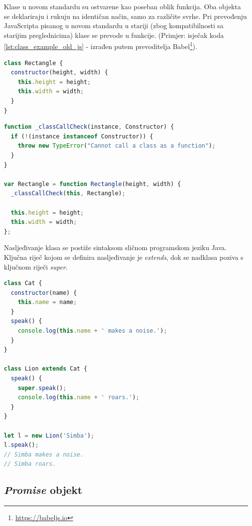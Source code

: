 \documentclass[times, utf8, zavrsni, numeric]{fer}
\newcommand{\razmakp}{\vspace{18pt}}
\newcommand{\razmaks}{\vspace{10pt}}
\begin{document}
Klase u novom standardu su ostvarene kao poseban oblik funkcija.\citep{MDNClass}
Oba objekta se deklariraju i rukuju na identičan način, samo za različite svrhe.
Pri prevođenju JavaScripta pisanog u novom standardu u stariji (zbog kompatibilnosti sa starijim preglednicima) klase se prevode u funkcije.
(Primjer: isječak koda \ref{lst:class_example_old_js} - izrađen putem prevoditelja Babel\footnote{\url{https://babeljs.io}}).

\razmakp
\begin{lstlisting}[language=JavaScript, caption={Primjer klase}, label={lst:class_example}]
class Rectangle {
  constructor(height, width) {
    this.height = height;
    this.width = width;
  }
}
\end{lstlisting}
\razmaks

\razmakp
\begin{lstlisting}[language=JavaScript, caption={Isječak koda \ref{lst:class_example} preveden u stari standard}, label={lst:class_example_old_js}]
function _classCallCheck(instance, Constructor) {
  if (!(instance instanceof Constructor)) {
    throw new TypeError("Cannot call a class as a function");
  }
}

var Rectangle = function Rectangle(height, width) {
  _classCallCheck(this, Rectangle);

  this.height = height;
  this.width = width;
};
\end{lstlisting}
\razmaks

Nasljeđivanje klasa se postiže sintaksom sličnom programskom jeziku Java.
Ključna riječ kojom se definira nasljeđivanje je \emph{extends}, dok se nadklasa poziva s ključnom riječi \emph{super}.

\razmakp
\begin{lstlisting}[language=JavaScript, caption={Primjer naljeđivanja}]
class Cat { 
  constructor(name) {
    this.name = name;
  }
  speak() {
    console.log(this.name + ' makes a noise.');
  }
}

class Lion extends Cat {
  speak() {
    super.speak();
    console.log(this.name + ' roars.');
  }
}

let l = new Lion('Simba');
l.speak(); 
// Simba makes a noise.
// Simba roars.
\end{lstlisting}
\razmaks


\subsection{\emph{Promise} objekt} \label{sec:promise}
\end{document}
